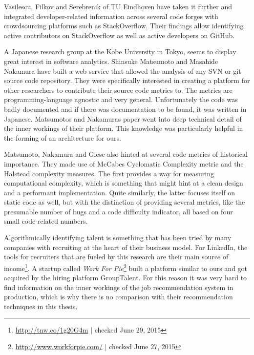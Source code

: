 Vasilescu, Filkov and Serebrenik of TU Eindhoven have taken it further
and integrated developer-related information across several code forges
with crowdsourcing platforms such as StackOverflow\cite{vfs:2012}.
Their findings allow identifying active contributors on StackOverflow
as well as active developers on GitHub.
\newline

A Japanese research group at the Kobe University in Tokyo, seems
to display great interest in software analytics\cite{mn:2011}. Shinsuke Matsumoto and Masahide Nakamura
have built a web service that allowed the analysis of any SVN or git source code repository.
They were specifically interested in creating a platform for other researchers to
contribute their source code metrics to. The metrics are programming-language agnostic
and very general. Unfortunately the code was badly documented and if there was documentation
to be found, it was written in Japanese. Matsumotos and Nakamuras paper
went into deep technical detail of the inner workings of their platform.
This knowledge was particularly helpful in the forming of an architecture for ours.

Matsumoto, Nakamura and Giese also hinted at several code metrics of historical
importance. They made use of McCabes Cyclomatic Complexity metric\cite{mc:1976}
and the Halstead complexity measures\cite{h:1977}.
The first provides a way for measuring computational complexity, which is
something that might hint at a clean design and a performant implementation.
Quite similarly, the latter focuses itself on static code as well, but with the
distinction of providing several metrics, like the presumable number of bugs and
a code difficulty indicator, all based on four small code-related numbers.
\newline

Algorithmically identifying talent is something that has been tried by many companies with recruiting at the heart of their business model. For LinkedIn, the tools for recruiters that are fueled by this research are their main source of income\footnote{\url{http://tnw.co/1g20G4m} | checked June 29, 2015}. A startup called \textit{Work For Pie}\footnote{\url{http://www.workforpie.com/} | checked June 27, 2015} built a platform similar to ours and got acquired by the hiring platform GroupTalent. For this reason it was very hard to find information on the inner workings of the job recommendation system in production, which is why there is no comparison with their recommendation techniques in this thesis.

